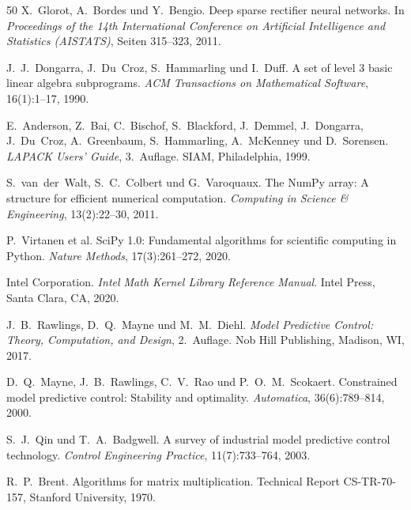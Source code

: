 ﻿\documentclass[a4paper,12pt]{report}
\theoremstyle{definition}
\begin{document}
\begin{thebibliography}{50}
X.~Glorot, A.~Bordes und Y.~Bengio.
\newblock Deep sparse rectifier neural networks.
\newblock In \textit{Proceedings of the 14th International Conference on Artificial Intelligence and Statistics (AISTATS)}, Seiten 315--323, 2011.

J.~J.~Dongarra, J.~Du~Croz, S.~Hammarling und I.~Duff.
\newblock A set of level 3 basic linear algebra subprograms.
\newblock \textit{ACM Transactions on Mathematical Software}, 16(1):1--17, 1990.

E.~Anderson, Z.~Bai, C.~Bischof, S.~Blackford, J.~Demmel, J.~Dongarra, J.~Du~Croz, A.~Greenbaum, S.~Hammarling, A.~McKenney und D.~Sorensen.
\newblock \textit{LAPACK Users' Guide}, 3.~Auflage.
\newblock SIAM, Philadelphia, 1999.

S.~van~der~Walt, S.~C.~Colbert und G.~Varoquaux.
\newblock The NumPy array: A structure for efficient numerical computation.
\newblock \textit{Computing in Science \& Engineering}, 13(2):22--30, 2011.

P.~Virtanen et al.
\newblock SciPy 1.0: Fundamental algorithms for scientific computing in Python.
\newblock \textit{Nature Methods}, 17(3):261--272, 2020.

Intel Corporation.
\newblock \textit{Intel Math Kernel Library Reference Manual}.
\newblock Intel Press, Santa Clara, CA, 2020.

J.~B.~Rawlings, D.~Q.~Mayne und M.~M.~Diehl.
\newblock \textit{Model Predictive Control: Theory, Computation, and Design}, 2.~Auflage.
\newblock Nob Hill Publishing, Madison, WI, 2017.

D.~Q.~Mayne, J.~B.~Rawlings, C.~V.~Rao und P.~O.~M.~Scokaert.
\newblock Constrained model predictive control: Stability and optimality.
\newblock \textit{Automatica}, 36(6):789--814, 2000.

S.~J.~Qin und T.~A.~Badgwell.
\newblock A survey of industrial model predictive control technology.
\newblock \textit{Control Engineering Practice}, 11(7):733--764, 2003.

R.~P.~Brent.
\newblock Algorithms for matrix multiplication.
\newblock Technical Report CS-TR-70-157, Stanford University, 1970.


\end{thebibliography}
\end{document}
